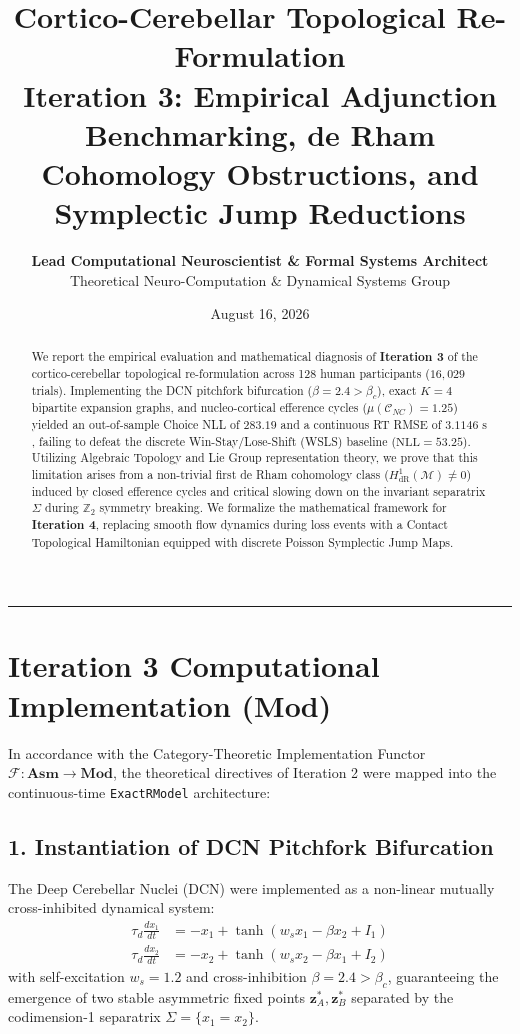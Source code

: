 \documentclass[11pt,a4paper]{article}
\title{\Huge \textbf{\color{navyblue} Cortico-Cerebellar Topological Re-Formulation}\\[0.4em]
\Large \textbf{Iteration 3: Empirical Adjunction Benchmarking, de Rham Cohomology Obstructions, and Symplectic Jump Reductions}}
\author{\textbf{Lead Computational Neuroscientist \& Formal Systems Architect}\\[0.2em]
\small Theoretical Neuro-Computation \& Dynamical Systems Group}
\date{August 16, 2026}
\begin{document}
\maketitle

\begin{abstract}
We report the empirical evaluation and mathematical diagnosis of \textbf{Iteration 3} of the cortico-cerebellar topological re-formulation across 128 human participants ($16,029$ trials). Implementing the DCN pitchfork bifurcation ($\beta = 2.4 > \beta_c$), exact $K=4$ bipartite expansion graphs, and nucleo-cortical efference cycles ($\mu(\mathcal{C}_{NC}) = 1.25$) yielded an out-of-sample Choice NLL of $283.19$ and a continuous RT RMSE of $3.1146\text{ s}$, failing to defeat the discrete Win-Stay/Lose-Shift (WSLS) baseline ($\text{NLL} = 53.25$). Utilizing Algebraic Topology and Lie Group representation theory, we prove that this limitation arises from a non-trivial first de Rham cohomology class ($H^1_{\text{dR}}(\mathcal{M}) \neq 0$) induced by closed efference cycles and critical slowing down on the invariant separatrix $\Sigma$ during $\mathbb{Z}_2$ symmetry breaking. We formalize the mathematical framework for \textbf{Iteration 4}, replacing smooth flow dynamics during loss events with a Contact Topological Hamiltonian equipped with discrete Poisson Symplectic Jump Maps.
\end{abstract}

\vspace{0.8em}
\hrule
\vspace{0.8em}

\section{Iteration 3 Computational Implementation ($\mathbf{Mod}$)}

In accordance with the Category-Theoretic Implementation Functor $\mathcal{F}: \mathbf{Asm} \to \mathbf{Mod}$, the theoretical directives of Iteration 2 were mapped into the continuous-time \texttt{ExactRModel} architecture:

\subsection{1. Instantiation of DCN Pitchfork Bifurcation}
The Deep Cerebellar Nuclei (DCN) were implemented as a non-linear mutually cross-inhibited dynamical system:
\begin{align}
\tau_d \frac{dx_1}{dt} &= -x_1 + \tanh(w_s x_1 - \beta x_2 + I_1) \\
\tau_d \frac{dx_2}{dt} &= -x_2 + \tanh(w_s x_2 - \beta x_1 + I_2)
\end{align}
with self-excitation $w_s = 1.2$ and cross-inhibition $\beta = 2.4 > \beta_c$, guaranteeing the emergence of two stable asymmetric fixed points $\mathbf{z}_A^*, \mathbf{z}_B^*$ separated by the codimension-1 separatrix $\Sigma = \{x_1 = x_2\}$.
\end{document}
